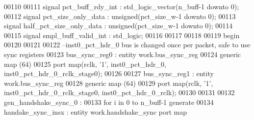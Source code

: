 \begin{DoxyCode}
00110 
00111 \textcolor{keywordflow}{signal} \textcolor{vhdlchar}{pct_buff_rdy_int}             \textcolor{vhdlchar}{:} \textcolor{comment}{std\_logic\_vector}\textcolor{vhdlchar}{(}\textcolor{vhdlchar}{n_buff}\textcolor{vhdlchar}{-}\textcolor{vhdllogic}{}\textcolor{vhdllogic}{1} \textcolor{keywordflow}{downto} \textcolor{vhdllogic}{}\textcolor{vhdllogic}{0}\textcolor{vhdlchar}{)};
00112 \textcolor{keywordflow}{signal} \textcolor{vhdlchar}{pct_size_only_data}           \textcolor{vhdlchar}{:} \textcolor{comment}{unsigned}\textcolor{vhdlchar}{(}\textcolor{vhdlchar}{pct_size_w}\textcolor{vhdlchar}{-}\textcolor{vhdllogic}{}\textcolor{vhdllogic}{1} \textcolor{keywordflow}{downto} \textcolor{vhdllogic}{}\textcolor{vhdllogic}{0}\textcolor{vhdlchar}{)};
00113 \textcolor{keywordflow}{signal} \textcolor{vhdlchar}{half_pct_size_only_data}      \textcolor{vhdlchar}{:} \textcolor{comment}{unsigned}\textcolor{vhdlchar}{(}\textcolor{vhdlchar}{pct_size_w}\textcolor{vhdlchar}{-}\textcolor{vhdllogic}{}\textcolor{vhdllogic}{1} \textcolor{keywordflow}{downto} \textcolor{vhdllogic}{}\textcolor{vhdllogic}{0}\textcolor{vhdlchar}{)};
00114 
00115 \textcolor{keywordflow}{signal} \textcolor{vhdlchar}{smpl_buff_valid_int}          \textcolor{vhdlchar}{:} \textcolor{comment}{std\_logic};
00116 
00117 
00118   
00119 \textcolor{vhdlkeyword}{begin}
00120 
00121 
00122 \textcolor{keyword}{--inst0\_pct\_hdr\_0 bus is changed once per packet, safe to use sync registers }
00123 bus\_sync\_reg0 : \textcolor{keywordflow}{entity} work.bus_sync_reg
00124  \textcolor{keywordflow}{generic} \textcolor{keywordflow}{map} (\textcolor{vhdllogic}{64}\textcolor{vhdlchar}{)} 
00125  \textcolor{keywordflow}{port} \textcolor{keywordflow}{map}(rclk, '1', inst0_pct_hdr_0, inst0_pct_hdr_0_rclk_stage0\textcolor{vhdlchar}{)};
00126 
00127 bus\_sync\_reg1 : \textcolor{keywordflow}{entity} work.bus_sync_reg
00128  \textcolor{keywordflow}{generic} \textcolor{keywordflow}{map} (\textcolor{vhdllogic}{64}\textcolor{vhdlchar}{)} 
00129  \textcolor{keywordflow}{port} \textcolor{keywordflow}{map}(rclk, '1', inst0_pct_hdr_0_rclk_stage0, inst0_pct_hdr_0_rclk\textcolor{vhdlchar}{)};
00130  
00131  
00132  \textcolor{vhdlchar}{gen\_handshake\_sync\_0}  \textcolor{vhdlchar}{:} 
00133    \textcolor{keywordflow}{for} \textcolor{vhdlchar}{i} \textcolor{keywordflow}{in} \textcolor{vhdllogic}{}\textcolor{vhdllogic}{0} \textcolor{keywordflow}{to} \textcolor{vhdlchar}{n_buff}\textcolor{vhdlchar}{-}\textcolor{vhdllogic}{}\textcolor{vhdllogic}{1} \textcolor{keywordflow}{generate} 
00134       handake\_sync\_insx : \textcolor{keywordflow}{entity} work.handshake_sync \textcolor{keywordflow}{port} \textcolor{keywordflow}{map}

\end{DoxyCode}
